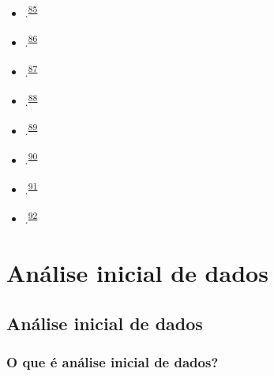 \documentclass[
]{book}
\begin{document}
\begin{itemize}
\item
  .\textsuperscript{\protect\hyperlink{ref-dwivedi2019}{85}}
\item
  .\textsuperscript{\protect\hyperlink{ref-Dwivedi2022}{86}}
\item
  .\textsuperscript{\protect\hyperlink{ref-Kim2017}{87}}
\item
  .\textsuperscript{\protect\hyperlink{ref-marusteri2010}{88}}
\item
  .\textsuperscript{\protect\hyperlink{ref-mishra2019}{89}}
\item
  .\textsuperscript{\protect\hyperlink{ref-ray2021}{90}}
\item
  .\textsuperscript{\protect\hyperlink{ref-nayak2011}{91}}
\item
  .\textsuperscript{\protect\hyperlink{ref-shankar2014}{92}}
\end{itemize}

\hypertarget{analise-inicial-dados}{%
\chapter{\texorpdfstring{\textbf{Análise inicial de dados}}{Análise inicial de dados}}\label{analise-inicial-dados}}

\hypertarget{analise-inicial}{%
\section{Análise inicial de dados}\label{analise-inicial}}

\hypertarget{o-que-uxe9-anuxe1lise-inicial-de-dados}{%
\subsection{O que é análise inicial de dados?}\label{o-que-uxe9-anuxe1lise-inicial-de-dados}}
\end{document}
